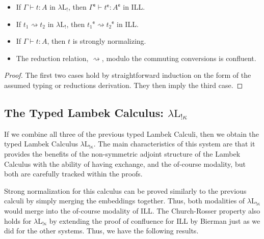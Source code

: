 \documentclass{llncs}
\newcommand{\redto}{\rightsquigarrow}
\newcommand{\Lnt}[1]{\mathit{#1}}
\begin{document}
\begin{theorem}
  \label{theorem:type_preserving_embedding_lambdaLk}
  \begin{itemize}
  \item If $ \Gamma  \vdash  \Lnt{t}  :  \Lnt{A} $ in $\lambda\text{L}_!$, then
    $  \Gamma ^{\mathsf{e} }   \vdash   \Lnt{t} ^{\mathsf{e} }   :    \Lnt{A} ^{\mathsf{e} }   $ in ILL.

  \item If $ \Lnt{t_{{\mathrm{1}}}}  \rightsquigarrow  \Lnt{t_{{\mathrm{2}}}} $ in $\lambda\text{L}_!$, then $  \Lnt{t_{{\mathrm{1}}}} ^{\mathsf{e} }   \rightsquigarrow    \Lnt{t_{{\mathrm{2}}}} ^{\mathsf{e} }   $
    in ILL.

  \item If $ \Gamma  \vdash  \Lnt{t}  :  \Lnt{A} $, then $\Lnt{t}$ is strongly normalizing.

  \item The reduction relation, $ \redto $, modulo the commuting
    conversions is confluent.
  \end{itemize}
\end{theorem}
\begin{proof}
  The first two cases hold by straightforward induction on the form of
  the assumed typing or reductions derivation.  They then imply the
  third case.
\end{proof}

\subsection{The Typed Lambek Calculus: $\lambda\text{L}_{!\kappa}$}
\label{subsec:the_typed_lambek_calculus:lambda-l-!kappa}
If we combine all three of the previous typed Lambek Calculi, then we
obtain the typed Lambek Calculus $\lambda\text{L}_{!\kappa}$.  The
main characteristics of this system are that it provides the benefits
of the non-symmetric adjoint structure of the Lambek Calculus with the
ability of having exchange, and the of-course modality, but both are
carefully tracked within the proofs.

Strong normalization for this calculus can be proved similarly to the
previous calculi by simply merging the embeddings together.  Thus,
both modalities of $\lambda\text{L}_{!\kappa}$ would merge into the
of-course modality of ILL.  The Church-Rosser property also holds for
$\lambda\text{L}_{!\kappa}$ by extending the proof of confluence for
ILL by Bierman \cite{Bierman:1994} just as we did for the other
systems.  Thus, we have the following results.
\end{document}
